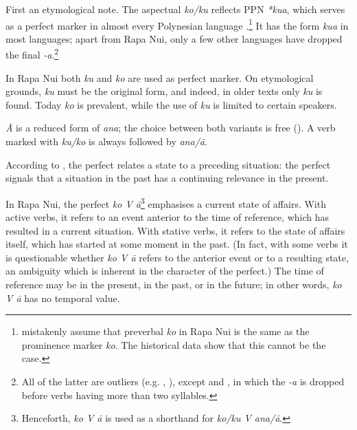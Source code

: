 First an etymological note. The aspectual  \textit{ko/ku} reflects PPN \textit{*kua}, which serves as a perfect  marker in almost every Polynesian language \citep[30]{Clark1976}.\footnote{\label{fn:331}\citet[15]{MassamLee2006} mistakenly assume that preverbal \textit{ko} in Rapa Nui is the same  as the prominence marker \textit{ko}. The historical data show that this cannot be the case.} It has the form \textit{kua} in most languages; apart from Rapa Nui, only a few other languages have dropped the final \textit{-a}.\footnote{\label{fn:332}All of the latter are outliers (e.g. , ), except  \citep[34]{Zewen1987} and  \citep[61]{Janeau1908}, in which the \textit{-a} is dropped before verbs having more than two syllables.} 

In Rapa Nui both \textit{ku} and \textit{ko} are used as perfect  marker. On etymological grounds, \textit{ku} must be the original form, and indeed, in older texts only \textit{ku} is found. Today \textit{ko} is prevalent, while the use of \textit{ku} is limited to certain speakers.

\textit{{\ꞌ}Ā} is a reduced form of \textit{{\ꞌ}ana}; the choice between both variants is free (). A verb marked with \textit{ku/ko} is always followed by \textit{{\ꞌ}ana/{\ꞌ}ā}. 

According to \citet{Comrie1976}, the perfect  relates a state to a preceding situation: the perfect signals that a situation in the past has a continuing relevance in the present.

In Rapa Nui, the perfect \textit{ko V {\ꞌ}ā}\footnote{\label{fn:333}Henceforth, \textit{ko V {\ꞌ}ā} is used as a shorthand for \textit{ko/ku V {\ꞌ}ana/{\ꞌ}ā}.} emphasises a current state of affairs. With active verbs, it refers to an event anterior to the time of reference, which has resulted in a current situation. With stative verbs, it refers to the state of affairs itself, which has started at some moment in the past. (In fact, with some verbs it is questionable whether \textit{ko V {\ꞌ}ā} refers to the anterior event or to a resulting state, an ambiguity which is inherent in the character of the perfect.) The time of reference may be in the present, in the past, or in the future; in other words, \textit{ko V {\ꞌ}ā} has no temporal value. 

